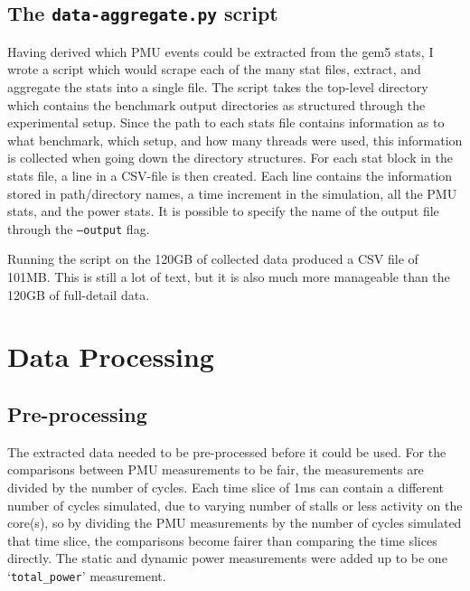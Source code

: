     \subsection{The \texttt{data-aggregate.py} script}
    Having derived which PMU events could be extracted from the gem5 stats, I 
    wrote a script which would scrape each of the many stat files, extract, and 
    aggregate the stats into a single file. The script takes the top-level 
    directory which contains the benchmark output directories as structured 
    through the experimental setup. Since the path to each stats file contains 
    information as to what benchmark, which setup, and how many threads were 
    used, this information is collected when going down the directory 
    structures. For each stat block in the stats file, a line in a CSV-file is 
    then created. Each line contains the information stored in path/directory 
    names, a time increment in the simulation, all the PMU stats, and the power 
    stats. It is possible to specify the name of the output file through the 
    \texttt{--output} flag.
    
    Running the script on the 120GB of collected data produced a CSV file of 
    101MB. This is still a lot of text, but it is also much more manageable than
    the 120GB of full-detail data.

\section{Data Processing}
    \subsection{Pre-processing}
    The extracted data needed to be pre-processed before it could be used. For 
    the comparisons between PMU measurements to be fair, the measurements are 
    divided by the number of cycles. Each time slice of 1ms can contain a 
    different number of cycles simulated, due to varying number of stalls or 
    less activity on the core(s), so by dividing the PMU measurements by the 
    number of cycles simulated that time slice, the comparisons become fairer 
    than comparing the time slices directly. The static and dynamic power 
    measurements were added up to be one `\texttt{total\_power}' measurement.
    
